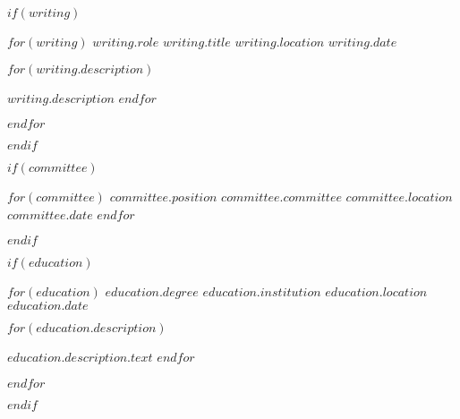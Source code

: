 \documentclass[11pt, a4paper]{awesome-cv}
\begin{document}
    $if(writing)$

    \begin{cventries}
        $for(writing)$
        \cventry
        {$writing.role$} %
        {$writing.title$} %
        {$writing.location$} %
        {$writing.date$} %
        {
        \begin{cvitems}
            $for(writing.description)$
            \item {$writing.description$}
            $endfor$
        \end{cvitems}
        }
        $endfor$
    \end{cventries}
    $endif$


    $if(committee)$

    \begin{cvhonors}
        $for(committee)$
        \cvhonor
        {$committee.position$} %
        {$committee.committee$} %
        {$committee.location$} %
        {$committee.date$} %
        {}
        $endfor$
    \end{cvhonors}
    $endif$


    $if(education)$

    \begin{cventries}
        $for(education)$
        \cventry
        {$education.degree$} %
        {$education.institution$} %
        {$education.location$} %
        {$education.date$} %
        {
        \begin{cvitems}
            $for(education.description)$
            \item {$education.description.text$}
            $endfor$
        \end{cvitems}
        }
        $endfor$
    \end{cventries}
    $endif$

\end{document}
